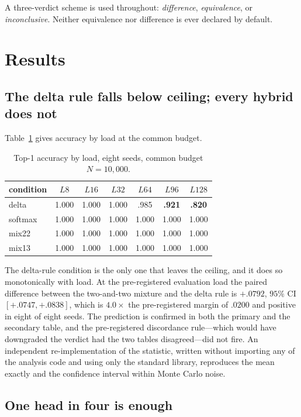 \documentclass[jou,11pt,donotrepeattitle]{apa7}
\begin{document}
A three-verdict scheme is used throughout: \emph{difference}, \emph{equivalence}, or
\emph{inconclusive}. Neither equivalence nor difference is ever declared by default.

\section{Results}

\subsection{The delta rule falls below ceiling; every hybrid does not}

Table~\ref{tab:main} gives accuracy by load at the common budget.

\begin{table}[htbp]
\centering
\caption{Top-1 accuracy by load, eight seeds, common budget $N=10{,}000$.}
\label{tab:main}
\begin{tabular}{lcccccc}
\toprule
condition & $L8$ & $L16$ & $L32$ & $L64$ & $L96$ & $L128$ \\
\midrule
delta   & 1.000 & 1.000 & 1.000 & .985 & \textbf{.921} & \textbf{.820} \\
softmax & 1.000 & 1.000 & 1.000 & 1.000 & 1.000 & 1.000 \\
mix22   & 1.000 & 1.000 & 1.000 & 1.000 & 1.000 & 1.000 \\
mix13   & 1.000 & 1.000 & 1.000 & 1.000 & 1.000 & 1.000 \\
\bottomrule
\end{tabular}
\end{table}

The delta-rule condition is the only one that leaves the ceiling, and it does so
monotonically with load. At the pre-registered evaluation load the paired difference between
the two-and-two mixture and the delta rule is $+.0792$, $95\%$ CI $[+.0747, +.0838]$, which is
$4.0\times$ the pre-registered margin of $.0200$ and positive in eight of eight seeds. The
prediction is confirmed in both the primary and the secondary table, and the pre-registered
discordance rule---which would have downgraded the verdict had the two tables disagreed---did
not fire. An independent re-implementation of the statistic, written without importing any of
the analysis code and using only the standard library, reproduces the mean exactly and the
confidence interval within Monte Carlo noise.

\subsection{One head in four is enough}
\end{document}
